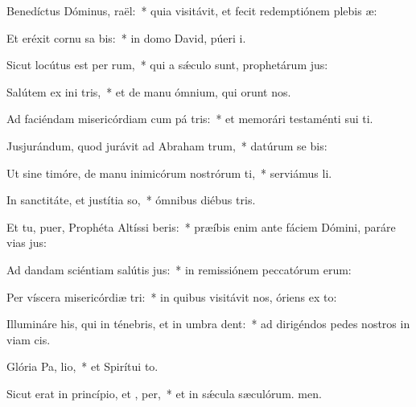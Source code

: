 \item Benedíctus Dóminus,  raël:~* quia visitávit, et fecit redemptiónem plebis æ:
\item Et eréxit cornu sa bis:~* in domo David, púeri i.
\item Sicut locútus est per  rum,~* qui a sǽculo sunt, prophetárum jus:
\item Salútem ex ini tris,~* et de manu ómnium, qui orunt nos.
\item Ad faciéndam misericórdiam cum pá tris:~* et memorári testaménti sui ti.
\item Jusjurándum, quod jurávit ad Abraham  trum,~* datúrum se bis:
\item Ut sine timóre, de manu inimicórum nostrórum ti,~* serviámus li.
\item In sanctitáte, et justítia  so,~* ómnibus diébus tris.
\item Et tu, puer, Prophéta Altíssi beris:~* præíbis enim ante fáciem Dómini, paráre vias jus:
\item Ad dandam sciéntiam salútis  jus:~* in remissiónem peccatórum erum:
\item Per víscera misericórdiæ  tri:~* in quibus visitávit nos, óriens ex to:
\item Illumináre his, qui in ténebris, et in umbra  dent:~* ad dirigéndos pedes nostros in viam cis.
\item Glória Pa,  lio,~* et Spirítui to.
\item Sicut erat in princípio, et ,  per,~* et in sǽcula sæculórum. men.
